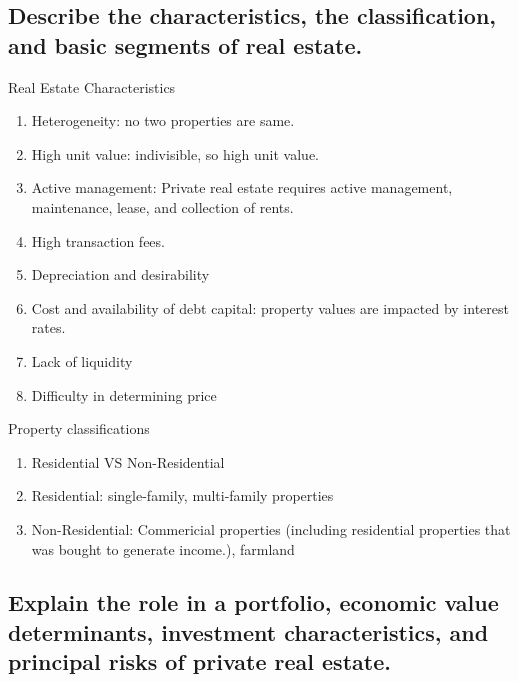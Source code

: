 \documentclass{article}
\newcommand{\be}{\begin{enumerate}}
\newcommand{\ee}{\end{enumerate}}
\begin{document}
\subsection{Describe the characteristics, the classification, and basic segments
of real estate.}
Real Estate Characteristics
\be
    \item Heterogeneity: no two properties are same.
    \item High unit value: indivisible, so high unit value.
    \item Active management: Private real estate requires active management, maintenance,
    lease, and collection of rents.
    \item High transaction fees.
    \item Depreciation and desirability
    \item Cost and availability of debt capital: property values are impacted by interest rates.
    \item Lack of liquidity
    \item Difficulty in determining price
\ee
Property classifications
\be
    \item Residential VS Non-Residential
    \item Residential:  single-family, multi-family properties
    \item Non-Residential: Commericial properties (including residential properties
    that was bought to generate income.), farmland
\ee
\subsection{Explain the role in a portfolio, economic value determinants, investment characteristics,
and principal risks of private real estate.}
\end{document}
